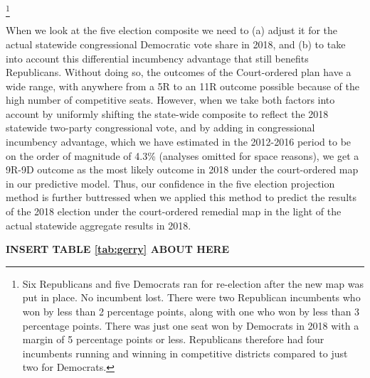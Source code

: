 		\footnote{Six Republicans and five Democrats ran for re-election after the new map was put in place. No incumbent lost. There were two Republican incumbents who won by less than 2 percentage points, along with one who won by less than 3 percentage points. There was just one seat won by Democrats in 2018 with a margin of 5 percentage points or less. Republicans therefore had four incumbents running and winning in competitive districts compared to just two for Democrats.}
\par
	When we look at the five election composite we need to (a) adjust it for the actual statewide congressional Democratic vote share in 2018, and (b) to take into account this differential incumbency advantage that still benefits Republicans. Without doing so, the outcomes of the Court-ordered plan have a wide range, with anywhere from a 5R to an 11R outcome possible because of the high number of competitive seats. However, when we take both factors into account by uniformly shifting the state-wide composite to reflect the 2018 statewide two-party congressional vote, and by adding in congressional incumbency advantage, which we have estimated in the 2012-2016 period to be on the order of magnitude of 4.3\% (analyses omitted for space reasons), we get a 9R-9D outcome as the most likely outcome in 2018 under the court-ordered map in our predictive model. Thus, our confidence in the five election projection method is further buttressed when we applied this method to predict the results of the 2018 election under the court-ordered remedial map in the light of the actual statewide aggregate results in 2018.

\begin{center}\textbf{INSERT TABLE \ref{tab:gerry} ABOUT HERE} \end{center}
\par
